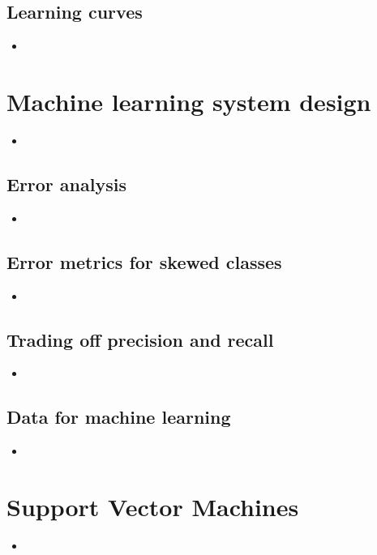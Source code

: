 \documentclass[13pt]{book}
\begin{document}
\section{Learning curves}
\begin{itemize}
  \item
\end{itemize}

\chapter{Machine learning system design}
\begin{itemize}
  \item
\end{itemize}

\section{Error analysis}
\begin{itemize}
  \item
\end{itemize}

\section{Error metrics for skewed classes}
\begin{itemize}
  \item
\end{itemize}

\section{Trading off precision and recall}
\begin{itemize}
  \item
\end{itemize}

\section{Data for machine learning}
\begin{itemize}
  \item
\end{itemize}

\chapter{Support Vector Machines}
\begin{itemize}
  \item
\end{itemize}
\end{document}
